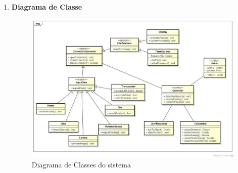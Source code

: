 \begin{enumerate}
\begin{enumerate}
  \item \textbf{Diagrama de Classe }
  \begin{figure}[h]
    \centering
    \includegraphics[width=450px, scale=1]{figuras/diagrama_classes}
    \caption{Diagrama de Classes do sistema}
  \label{fig:diagrama_classes}
  \end{figure}

\end{enumerate}
\end{enumerate}
